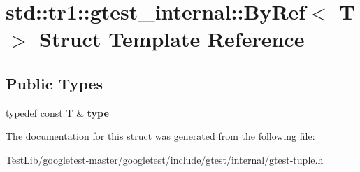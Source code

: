 \hypertarget{structstd_1_1tr1_1_1gtest__internal_1_1ByRef}{}\section{std\+:\+:tr1\+:\+:gtest\+\_\+internal\+:\+:By\+Ref$<$ T $>$ Struct Template Reference}
\label{structstd_1_1tr1_1_1gtest__internal_1_1ByRef}
\subsection*{Public Types}
\begin{DoxyCompactItemize}
\item 
\mbox{\label{structstd_1_1tr1_1_1gtest__internal_1_1ByRef_ac42ad942ee1cfa86b2abcce9b88ac10e}} 
typedef const T \& {\bfseries type}
\end{DoxyCompactItemize}


The documentation for this struct was generated from the following file\+:\begin{DoxyCompactItemize}
\item 
Test\+Lib/googletest-\/master/googletest/include/gtest/internal/gtest-\/tuple.\+h\end{DoxyCompactItemize}
